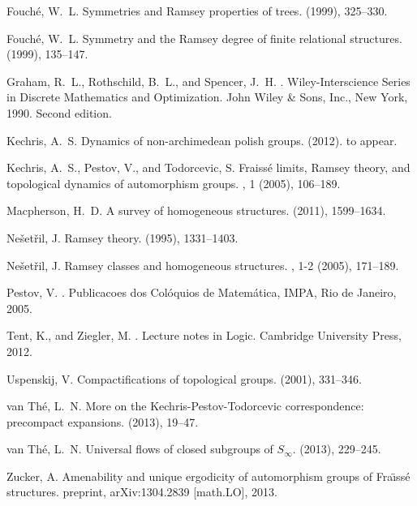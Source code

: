 \documentclass[12pt]{amsart}
\theoremstyle{plain}
\theoremstyle{definition}
\begin{document}
\begin{thebibliography}{10}
{\sc Fouch\'e, W.~L.}
\newblock Symmetries and {R}amsey properties of trees.
 (1999), 325--330.

{\sc Fouch\'e, W.~L.}
\newblock Symmetry and the {R}amsey degree of finite relational structures.
 (1999), 135--147.

{\sc Graham, R.~L., Rothschild, B.~L., and Spencer, J.~H.}
.
\newblock Wiley-Interscience Series in Discrete Mathematics and Optimization.
  John Wiley \& Sons, Inc., New York, 1990.
\newblock Second edition.

{\sc Kechris, A.~S.}
\newblock Dynamics of non-archimedean polish groups.
 (2012).
\newblock to appear.

{\sc Kechris, A.~S., Pestov, V., and Todorcevic, S.}
\newblock Fraiss\'e limits, {R}amsey theory, and topological dynamics of
  automorphism groups.
, 1 (2005), 106--189.

{\sc Macpherson, H.~D.}
\newblock A survey of homogeneous structures.
 (2011), 1599--1634.

{\sc Ne\v{s}et\v{r}il, J.}
\newblock Ramsey theory.
 (1995), 1331--1403.

{\sc Ne\v{s}et\v{r}il, J.}
\newblock Ramsey classes and homogeneous structures.
, 1-2 (2005),
  171--189.

{\sc Pestov, V.}
.
\newblock Publicacoes dos Col\'oquios de Matem\'atica, IMPA, Rio de Janeiro,
  2005.

{\sc Tent, K., and Ziegler, M.}
.
\newblock Lecture notes in Logic. Cambridge University Press, 2012.

{\sc Uspenskij, V.}
\newblock Compactifications of topological groups.
 (2001),
  331--346.

{\sc van Th\'{e}, L.~N.}
\newblock More on the {K}echris-{P}estov-{T}odorcevic correspondence:
  precompact expansions.
 (2013), 19--47.

{\sc van Th\'{e}, L.~N.}
\newblock Universal flows of closed subgroups of ${S}_\infty$.
 (2013), 229--245.

{\sc Zucker, A.}
\newblock Amenability and unique ergodicity of automorphism groups of
  {F}ra\"{\i}ss\'{e} structures.
\newblock preprint, arXiv:1304.2839 [math.LO], 2013.

\end{thebibliography}
\end{document}
